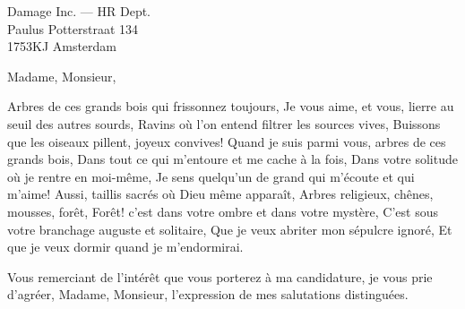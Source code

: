 \documentclass[a4paper,fontsize=12pt,NF]{scrlttr2}
\begin{document}
\begin{letter}{%
	Damage Inc. --- HR Dept.\\%
	Paulus Potterstraat 134\\%
	1753KJ Amsterdam}



\opening{Madame, Monsieur,}

Arbres de ces grands bois qui frissonnez toujours,
Je vous aime, et vous, lierre au seuil des autres sourds,
Ravins où l'on entend filtrer les sources vives,
Buissons que les oiseaux pillent, joyeux convives!
Quand je suis parmi vous, arbres de ces grands bois,
Dans tout ce qui m'entoure et me cache à la fois,
Dans votre solitude où je rentre en moi-même,
Je sens quelqu'un de grand qui m'écoute et qui m'aime!
Aussi, taillis sacrés où Dieu même apparaît,
Arbres religieux, chênes, mousses, forêt,
Forêt! c'est dans votre ombre et dans votre mystère,
C'est sous votre branchage auguste et solitaire,
Que je veux abriter mon sépulcre ignoré,
Et que je veux dormir quand je m'endormirai.


\closing{Vous remerciant de l'int\'er\^et que vous porterez \`a ma candidature, je vous prie d'agr\'eer, Madame, Monsieur, l'expression de mes salutations distingu\'ees.}
					    

\end{letter}
\end{document}
